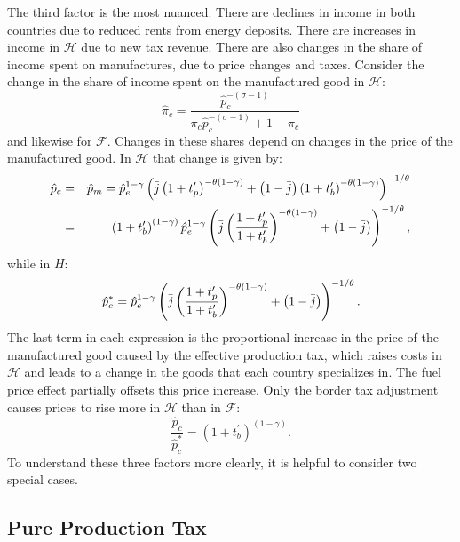 \documentclass[notitlepage,12pt]{article}
\begin{document}
The third factor is the most nuanced. There are declines in income in both
countries due to reduced rents from energy deposits. There are increases in
income in $\mathcal{H}$ due to new tax revenue. There are also changes in
the share of income spent on manufactures, due to price changes and taxes.
Consider the change in the share of income spent on the manufactured good in 
$\mathcal{H}$:%
\begin{equation*}
\hat{\pi}_{c}=\frac{\hat{p}_{c}^{-\left( \sigma -1\right) }}{\pi _{c}\hat{p}%
_{c}^{-\left( \sigma -1\right) }+1-\pi _{c}}
\end{equation*}%
and likewise for $\mathcal{F}$. Changes in these shares depend on changes in
the price of the manufactured good. In $\mathcal{H}$ that change is given by:%
\begin{eqnarray*}
\hat{p}_{c} &=&\hat{p}_{m}=\hat{p}_{e}^{1-\gamma }\left( \bar{j}\left(
1+t_{p}^{\prime }\right) ^{-\theta \left( 1-\gamma \right) }+\left( 1-\bar{j}%
\right) \left( 1+t_{b}^{\prime }\right) ^{-\theta \left( 1-\gamma \right)
}\right) ^{-1/\theta } \\
&=&\left( 1+t_{b}^{\prime }\right) ^{\left( 1-\gamma \right) }\hat{p}%
_{e}^{1-\gamma }\left( \bar{j}\left( \frac{1+t_{p}^{\prime }}{%
1+t_{b}^{\prime }}\right) ^{-\theta \left( 1-\gamma \right) }+\left( 1-\bar{j%
}\right) \right) ^{-1/\theta },
\end{eqnarray*}%
while in $H$:%
\begin{equation*}
\hat{p}_{c}^{\ast }=\hat{p}_{e}^{1-\gamma }\left( \bar{j}\left( \frac{%
1+t_{p}^{\prime }}{1+t_{b}^{\prime }}\right) ^{-\theta \left( 1-\gamma
\right) }+\left( 1-\bar{j}\right) \right) ^{-1/\theta }.
\end{equation*}%
The last term in each expression is the proportional increase in the price
of the manufactured good caused by the effective production tax, which
raises costs in $\mathcal{H}$ and leads to a change in the goods that each
country specializes in. The fuel price effect partially offsets this price
increase. Only the border tax adjustment causes prices to rise more in $%
\mathcal{H}$ than in $\mathcal{F}$:%
\begin{equation*}
\frac{\hat{p}_{c}}{\hat{p}_{c}^{\ast }}=\left( 1+t_{b}^{\prime }\right)
^{\left( 1-\gamma \right) }.
\end{equation*}%
To understand these three factors more clearly, it is helpful to consider
two special cases.

\subsection{Pure Production Tax}
\end{document}
